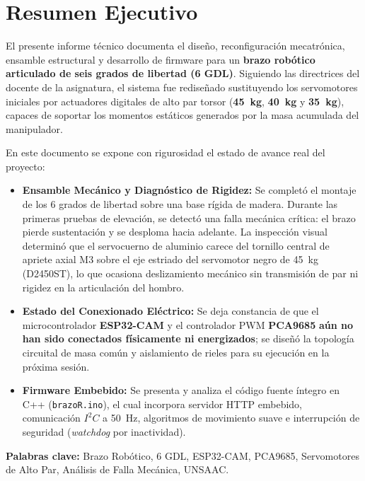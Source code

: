 \documentclass[11pt,a4paper]{article}
\begin{document}
\section*{Resumen Ejecutivo}

El presente informe técnico documenta el diseño, reconfiguración mecatrónica, ensamble estructural y desarrollo de firmware para un \textbf{brazo robótico articulado de seis grados de libertad (6 GDL)}. Siguiendo las directrices del docente de la asignatura, el sistema fue rediseñado sustituyendo los servomotores iniciales por actuadores digitales de alto par torsor (\textbf{45~kg}, \textbf{40~kg} y \textbf{35~kg}), capaces de soportar los momentos estáticos generados por la masa acumulada del manipulador.

En este documento se expone con rigurosidad el estado de avance real del proyecto:
\begin{itemize}
    \item \textbf{Ensamble Mecánico y Diagnóstico de Rigidez:} Se completó el montaje de los 6 grados de libertad sobre una base rígida de madera. Durante las primeras pruebas de elevación, se detectó una falla mecánica crítica: el brazo pierde sustentación y se desploma hacia adelante. La inspección visual determinó que el servocuerno de aluminio carece del tornillo central de apriete axial M3 sobre el eje estriado del servomotor negro de 45~kg (D2450ST), lo que ocasiona deslizamiento mecánico sin transmisión de par ni rigidez en la articulación del hombro.
    \item \textbf{Estado del Conexionado Eléctrico:} Se deja constancia de que el microcontrolador \textbf{ESP32-CAM} y el controlador PWM \textbf{PCA9685} \textbf{aún no han sido conectados físicamente ni energizados}; se diseñó la topología circuital de masa común y aislamiento de rieles para su ejecución en la próxima sesión.
    \item \textbf{Firmware Embebido:} Se presenta y analiza el código fuente íntegro en C++ (\texttt{brazoR.ino}), el cual incorpora servidor HTTP embebido, comunicación $I^2C$ a 50~Hz, algoritmos de movimiento suave e interrupción de seguridad (\textit{watchdog} por inactividad).
\end{itemize}

\vspace{0.4cm}
\noindent\textbf{Palabras clave:} Brazo Robótico, 6 GDL, ESP32-CAM, PCA9685, Servomotores de Alto Par, Análisis de Falla Mecánica, UNSAAC.
\end{document}
